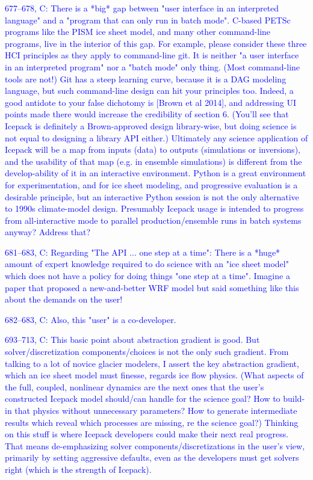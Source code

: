 \documentclass{article}
\theoremstyle{definition}
\theoremstyle{plain}
\begin{document}
\textcolor{blue}{677--678, C:  There is a *big* gap between "user interface in an interpreted language" and a "program that can only run in batch mode".  C-based PETSc programs like the PISM ice sheet model, and many other command-line programs, live in the interior of this gap.  For example, please consider these three HCI principles as they apply to command-line git.  It is neither "a user interface in an interpreted program" nor a "batch mode" only thing.  (Most command-line tools are not!)  Git has a steep learning curve, because it is a DAG modeling language, but such command-line design can hit your principles too.  Indeed, a good antidote to your false dichotomy is [Brown et al 2014], and addressing UI points made there would increase the credibility of section 6.  (You'll see that Icepack is definitely a Brown-approved design library-wise, but doing science is not equal to designing a library API either.)  Ultimately any science application of Icepack will be a map from inputs (data) to outputs (simulations or inversions), and the usability of that map (e.g. in ensemble simulations) is different from the develop-ability of it in an interactive environment.  Python is a great environment for experimentation, and for ice sheet modeling, and progressive evaluation is a desirable principle, but an interactive Python session is not the only alternative to 1990s climate-model design.  Presumably Icepack usage is intended to progress from all-interactive mode to parallel production/ensemble runs in batch systems anyway?  Address that?}

\textcolor{blue}{681--683, C:  Regarding "The API ... one step at a time":  There is a *huge* amount of expert knowledge required to do science with an "ice sheet model" which does not have a policy for doing things "one step at a time".  Imagine a paper that proposed a new-and-better WRF model but said something like this about the demands on the user!}

\textcolor{blue}{682--683, C:  Also, this "user" is a co-developer.}

\textcolor{blue}{693--713, C:  This basic point about abstraction gradient is good.  But solver/discretization components/choices is not the only such gradient.  From talking to a lot of novice glacier modelers, I assert the key abstraction gradient, which an ice sheet model must finesse, regards ice flow physics.  (What aspects of the full, coupled, nonlinear dynamics are the next ones that the user's constructed Icepack model should/can handle for the science goal?  How to build-in that physics without unnecessary parameters?  How to generate intermediate results which reveal which processes are missing, re the science goal?)  Thinking on this stuff is where Icepack developers could make their next real progress.  That means de-emphasizing solver components/discretizations in the user's view, primarily by setting aggressive defaults, even as the developers must get solvers right (which is the strength of Icepack).}
\end{document}
